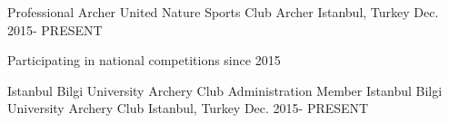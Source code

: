 \begin{cventries}
\cventry
{Professional Archer} %
{United Nature Sports Club Archer} %
{Istanbul, Turkey} %
{Dec. 2015- PRESENT} %
{ %
\begin{cvitems}
\item {Participating in national competitions since 2015}
\end{cvitems}
}


\cventry
{Istanbul Bilgi University Archery Club Administration Member} %
{Istanbul Bilgi University Archery Club} %
{Istanbul, Turkey} %
{Dec. 2015- PRESENT} %
{}%




\end{cventries}